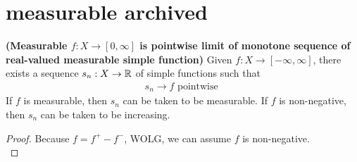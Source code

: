 \documentclass{report}
\begin{document}
\section{measurable archived}

\begin{theorem}
\textbf{(Measurable $f:X\rightarrow [0,\infty]$ is pointwise limit of monotone sequence of real-valued measurable simple function)} Given $f:X\rightarrow [-\infty,\infty]$, there exists a sequence $s_n:X\rightarrow \mathbb{R}$ of simple functions such that 
\begin{align*}
s_n\to f\text{ pointwise }
\end{align*}
If $f$ is measurable, then $s_n$ can be taken to be measurable. If  $f$ is non-negative, then $s_n$ can be taken to be increasing.
\end{theorem}
\begin{proof}
Because $f=f^+-f^-$, WOLG, we  can assume $f$ is non-negative.\\


\end{proof}
\end{document}
